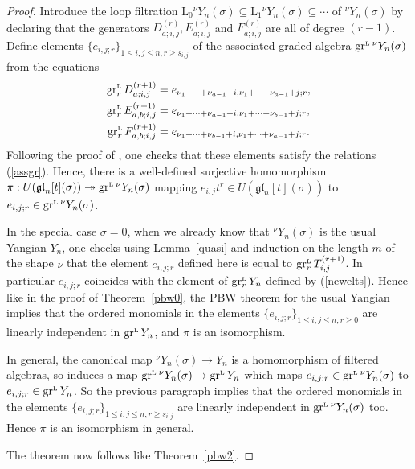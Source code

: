 \documentclass[twoside,12pt,reqno]{amsart}
\def\LL{{{\scriptscriptstyle\text{\rm{L}}}}}
\def\L{\mathrm{L}}
\def\gr{\operatorname{gr}}
\begin{document}
\begin{proof}
Introduce the loop filtration 
$\L_0 {^\nu}Y_n(\sigma) \subseteq \L_1 {^\nu}Y_n(\sigma) \subseteq
\cdots$
of ${^\nu}Y_n(\sigma)$ by declaring
that the generators $D_{a;i,j}^{(r)}, E_{a;i,j}^{(r)}$
and $F_{a;i,j}^{(r)}$ are all of degree $(r-1)$. 
Define elements $\{e_{i,j;r}\}_{1 \leq i,j \leq n, r \geq s_{i,j}}$
of the associated graded algebra $\gr^\LL {^\nu}Y_n(\sigma)$
from the equations
\begin{align}
\label{bday1}
\gr^\LL_{r} D_{a;i,j}^{(r+1)} &= 
e_{\nu_1+\cdots+\nu_{a-1}+i,\nu_1+\cdots+\nu_{a-1}+j;r},\\
\label{bday2}
\gr^\LL_{r} E_{a,b;i,j}^{(r+1)} &= 
e_{\nu_1+\cdots+\nu_{a-1}+i, \nu_1+\cdots+\nu_{b-1}+j;r},\\
\label{bday3}
\gr^\LL_{r} F_{a,b;i,j}^{(r+1)} &= 
e_{\nu_1+\cdots+\nu_{b-1}+i,
\nu_1+\cdots+\nu_{a-1}+j;r}.
\end{align}
Following the proof of 
\cite[Lemma 6.7]{BK}, one checks that these elements
satisfy the relations (\ref{assgr}).
Hence, there is a
well-defined surjective homomorphism
$\pi:U(\mathfrak{gl}_n[t](\sigma)) \twoheadrightarrow \gr^\LL {^\nu}Y_n(\sigma)$
mapping $e_{i,j} t^r \in U(\mathfrak{gl}_n[t](\sigma))$
to $e_{i,j;r} \in \gr^\LL {^\nu}Y_n(\sigma)$.

In the special case $\sigma = 0$, when we already know that 
${^\nu}Y_n(\sigma)$ is the usual
Yangian $Y_n$, one checks using Lemma~\ref{quasi} and induction
on the length $m$ of the shape $\nu$ that the element
$e_{i,j;r}$ defined here is equal to $\gr^\LL_r T_{i,j}^{(r+1)}$.
In particular $e_{i,j;r}$ coincides with the element
of $\gr^\LL_r Y_n$ defined by (\ref{newelts}).
Hence like in the proof of Theorem~\ref{pbw0},
the PBW theorem for the usual Yangian implies that the ordered monomials
in the elements
$\{e_{i,j;r}\}_{1 \leq i,j \leq n, r \geq 0}$ are linearly independent
in $\gr^\LL Y_n$, and $\pi$ is an isomorphism.

In general, the canonical map ${^\nu}Y_n(\sigma) \rightarrow Y_n$
is a homomorphism of filtered algebras, so induces a map
$\gr^\LL {^\nu}Y_n(\sigma) \rightarrow \gr^\LL Y_n$ which maps
$e_{i,j;r} \in \gr^\LL {^\nu}Y_n(\sigma)$ to $e_{i,j;r} \in \gr^\LL Y_n$.
So the previous paragraph implies that the ordered monomials
in the elements $\{e_{i,j;r}\}_{1 \leq i,j \leq n, r \geq s_{i,j}}$
are linearly independent in $\gr^\LL {^\nu}Y_n(\sigma)$ too.
Hence $\pi$ is an isomorphism
in general.

The theorem now follows like Theorem~\ref{pbw2}.
\end{proof}
\end{document}
